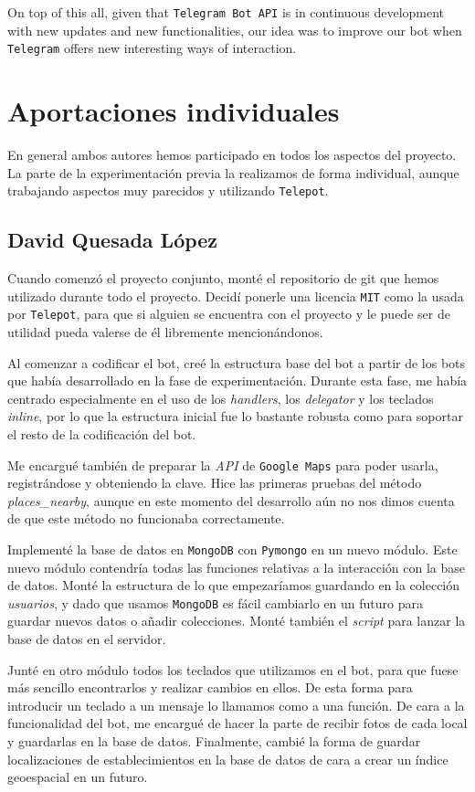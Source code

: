 \documentclass[oneside]{memoir}
\newcommand{\mychapter}[2]{
    \setcounter{chapter}{#1}
    \setcounter{section}{0}
    \chapter*{#2}
    \addcontentsline{toc}{chapter}{#2}
}
\begin{document}
On top of this all, given that \texttt{Telegram Bot API} is in continuous development with new updates and new functionalities, our idea was to improve our bot when \texttt{Telegram} offers new interesting ways of interaction.

\setcounter{secnumdepth}{0}%
\newpage
\mychapter{9}{Aportaciones individuales}
En general ambos autores hemos participado en todos los aspectos del proyecto. La parte de la experimentación previa la realizamos de forma individual, aunque trabajando aspectos muy parecidos y utilizando \texttt{Telepot}.

\section{David Quesada L\'opez}
Cuando comenzó el proyecto conjunto, monté el repositorio de git que hemos utilizado durante todo el proyecto. Decidí ponerle una licencia \texttt{MIT} como la usada por \texttt{Telepot}, para que si alguien se encuentra con el proyecto y le puede ser de utilidad pueda valerse de él libremente mencionándonos.

Al comenzar a codificar el bot, creé la estructura base del bot a partir de los bots que había desarrollado en la fase de experimentación. Durante esta fase, me había centrado especialmente en el uso de los \textit{handlers}, los \textit{delegator} y los teclados \textit{inline}, por lo que la estructura inicial fue lo bastante robusta como para soportar el resto de la codificación del bot.

Me encargué también de preparar la \textit{API} de \texttt{Google Maps} para poder usarla, registrándose y obteniendo la clave. Hice las primeras pruebas del método \textit{places\_nearby}, aunque en este momento del desarrollo aún no nos dimos cuenta de que este método no funcionaba correctamente. 

Implementé la base de datos en \texttt{MongoDB} con \texttt{Pymongo} en un nuevo módulo. Este nuevo módulo contendría todas las funciones relativas a la interacción con la base de datos. Monté la estructura de lo que empezaríamos guardando en la colección \textit{usuarios}, y dado que usamos \texttt{MongoDB} es fácil cambiarlo en un futuro para guardar nuevos datos o añadir colecciones. Monté también el \textit{script} para lanzar la base de datos en el servidor. 

Junté en otro módulo todos los teclados que utilizamos en el bot, para que fuese más sencillo encontrarlos y realizar cambios en ellos. De esta forma para introducir un teclado a un mensaje lo llamamos como a una función. De cara a la funcionalidad del bot, me encargué de hacer la parte de recibir fotos de cada local y guardarlas en la base de datos. Finalmente, cambié la forma de guardar localizaciones de establecimientos en la base de datos de cara a crear un índice geoespacial en un futuro.
\end{document}
